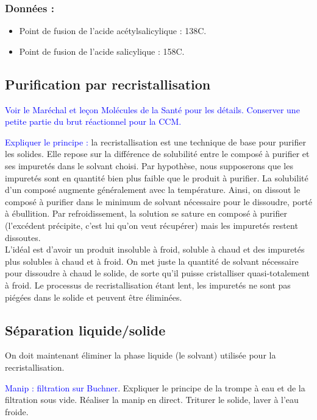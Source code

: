 \documentclass[11pt,a4paper]{report}
\begin{document}
\subsubsection*{Données :}
\begin{itemize}
	\item Point de fusion de l'acide acétylsalicylique : 138\degree C.
	\item Point de fusion de l'acide salicylique : 158\degree C.
\end{itemize}

\subsection{Purification par recristallisation}

\textcolor{blue}{Voir le Maréchal et leçon Molécules de la Santé pour les détails. Conserver une petite partie du brut réactionnel pour la CCM.}

\textcolor{blue}{Expliquer le principe :} la recristallisation est une technique de base pour purifier les solides. Elle repose sur la différence de solubilité entre le composé à purifier et ses impuretés dans le solvant choisi. Par hypothèse, nous supposerons que les impuretés sont en quantité bien plus faible que le produit à purifier. La solubilité d'un composé augmente généralement avec la température. Ainsi, on dissout le composé à purifier dans le minimum de solvant nécessaire pour le dissoudre, porté à ébullition. Par refroidissement, la solution se sature en composé à purifier (l'excédent précipite, c'est lui qu'on veut récupérer) mais les impuretés restent dissoutes.\\

L'idéal est d'avoir un produit insoluble à froid, soluble à chaud et des impuretés plus solubles à chaud et à froid. On met juste la quantité de solvant nécessaire pour dissoudre à chaud le solide, de sorte qu'il puisse cristalliser quasi-totalement à froid. Le processus de recristallisation étant lent, les impuretés ne sont pas piégées dans le solide et peuvent être éliminées.

\subsection{Séparation liquide/solide}

On doit maintenant éliminer la phase liquide (le solvant) utilisée pour la recristallisation.

\textcolor{blue}{Manip : filtration sur Buchner}. Expliquer le principe de la trompe à eau et de la filtration sous vide. Réaliser la manip en direct. Triturer le solide, laver à l'eau froide.
\end{document}
